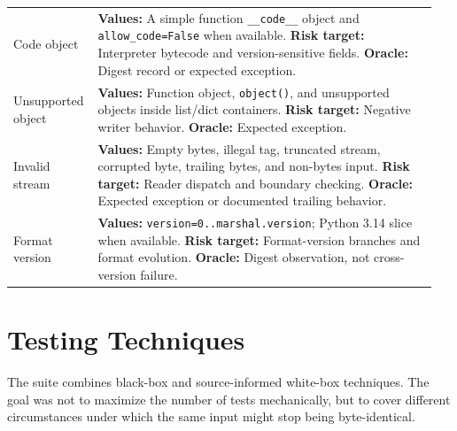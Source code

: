 \documentclass[10pt,a4paper]{article}
\begin{document}
\begin{longtable}{@{}L{0.17\linewidth}L{0.78\linewidth}@{}}
Code object &
\textbf{Values:} A simple function \texttt{\_\_code\_\_} object and \texttt{allow\_code=False} when available. \newline
\textbf{Risk target:} Interpreter bytecode and version-sensitive fields. \newline
\textbf{Oracle:} Digest record or expected exception. \\

Unsupported object &
\textbf{Values:} Function object, \texttt{object()}, and unsupported objects inside list/dict containers. \newline
\textbf{Risk target:} Negative writer behavior. \newline
\textbf{Oracle:} Expected exception. \\

Invalid stream &
\textbf{Values:} Empty bytes, illegal tag, truncated stream, corrupted byte, trailing bytes, and non-bytes input. \newline
\textbf{Risk target:} Reader dispatch and boundary checking. \newline
\textbf{Oracle:} Expected exception or documented trailing behavior. \\

Format version &
\textbf{Values:} \texttt{version=0..marshal.version}; Python 3.14 slice when available. \newline
\textbf{Risk target:} Format-version branches and format evolution. \newline
\textbf{Oracle:} Digest observation, not cross-version failure. \\

\bottomrule
\end{longtable}
\endgroup

\section{Testing Techniques}

The suite combines black-box and source-informed white-box techniques. The goal was not to maximize the number of tests mechanically, but to cover different circumstances under which the same input might stop being byte-identical.

\begingroup
\normalsize
\setlength{\tabcolsep}{6pt}
\renewcommand{\arraystretch}{1.18}
\end{document}
